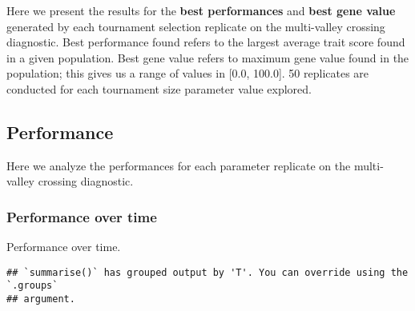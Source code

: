 \documentclass[]{book}
\newenvironment{Shaded}{\begin{snugshade}}{\end{snugshade}}
\newcommand{\DataTypeTok}[1]{\textcolor[rgb]{0.13,0.29,0.53}{#1}}
\newcommand{\KeywordTok}[1]{\textcolor[rgb]{0.13,0.29,0.53}{\textbf{#1}}}
\newcommand{\NormalTok}[1]{#1}
\newcommand{\OperatorTok}[1]{\textcolor[rgb]{0.81,0.36,0.00}{\textbf{#1}}}
\newcommand{\StringTok}[1]{\textcolor[rgb]{0.31,0.60,0.02}{#1}}
\begin{document}
Here we present the results for the \textbf{best performances} and \textbf{best gene value} generated by each tournament selection replicate on the multi-valley crossing diagnostic.
Best performance found refers to the largest average trait score found in a given population.
Best gene value refers to maximum gene value found in the population; this gives us a range of values in {[}0.0, 100.0{]}.
50 replicates are conducted for each tournament size parameter value explored.

\hypertarget{performance-5}{%
\subsection{Performance}\label{performance-5}}

Here we analyze the performances for each parameter replicate on the multi-valley crossing diagnostic.

\hypertarget{performance-over-time-9}{%
\subsubsection{Performance over time}\label{performance-over-time-9}}

Performance over time.

\begin{Shaded}
\end{Shaded}

\begin{verbatim}
## `summarise()` has grouped output by 'T'. You can override using the `.groups`
## argument.
\end{verbatim}
\end{document}
